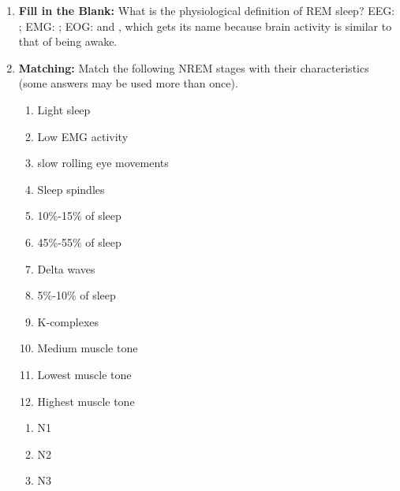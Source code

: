 \begin{enumerate}[label = \textbf{Q4.4.\arabic*}]
    \item \textbf{Fill in the Blank:} What is the physiological definition of REM sleep? EEG: \underline{\hspace{3cm}}; EMG: \underline{\hspace{3cm}}; EOG: \underline{\hspace{3cm}} and \underline{\hspace{3cm}}, which gets its name because brain activity is similar to that of being awake.
\newpage
    \item \textbf{Matching:} Match the following NREM stages with their characteristics (some answers may be used more than once).
    \begin{wordbox}
\begin{multicols}{2}
        \begin{enumerate}[label=(\Alph*)]
            \item Light sleep
            \item Low EMG activity
            \item slow rolling eye movements
            \item Sleep spindles
            \item 10\%-15\% of sleep
            \item 45\%-55\% of sleep
            \item Delta waves
            \item 5\%-10\% of sleep 
            \item K-complexes
            \item Medium muscle tone
            \item Lowest muscle tone
            \item Highest muscle tone
        \end{enumerate}
\end{multicols}
    \end{wordbox}
    \begin{enumerate}[label=(\alph*)]
        \item N1 \quad \dotfill \quad \underline{\hspace{3cm}}\\[0.5em]
        \item N2 \quad \dotfill \quad \underline{\hspace{3cm}}\\[0.5em]
        \item N3 \quad \dotfill \quad \underline{\hspace{3cm}}
    \end{enumerate}
\end{enumerate}
